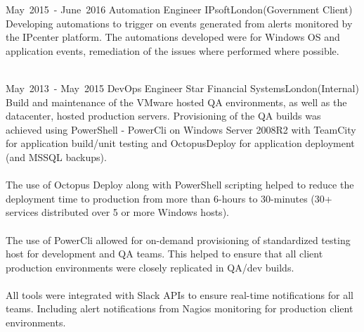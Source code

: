 \cventry %
  {\mbox{May 2015 -} \mbox{June 2016}}
  {Automation Engineer}
  {IPsoft}{London}{(Government Client)}
  {
    Developing automations to trigger on events generated from alerts monitored 
    by the IPcenter platform. 
    The automations developed were for Windows OS and application events, 
    remediation of the issues where performed where possible.\\~\\
  }

\cventry %
  {\mbox{May 2013 -} \mbox{May 2015}}
  {DevOps Engineer}
  {Star Financial Systems}{London}{(Internal)}
  {
    Build and maintenance of the VMware hosted QA environments, as well as the datacenter, 
    hosted production servers. Provisioning of the QA builds was achieved using PowerShell - PowerCli 
    on Windows Server 2008R2 with TeamCity for application build/unit testing and OctopusDeploy 
    for application deployment (and MSSQL backups).\\~\\
    The use of Octopus Deploy along with PowerShell scripting helped to reduce the deployment time 
    to production from more than 6-hours to 30-minutes (30+ services distributed over 5 or more Windows hosts).\\~\\
    The use of PowerCli allowed for on-demand provisioning of standardized testing host for development and QA teams. 
    This helped to ensure that all client production environments were closely replicated in QA/dev builds.\\~\\
    All tools were integrated with Slack APIs to ensure real-time notifications for all teams.
    Including alert notifications from Nagios monitoring for production client environments.\\
  }

